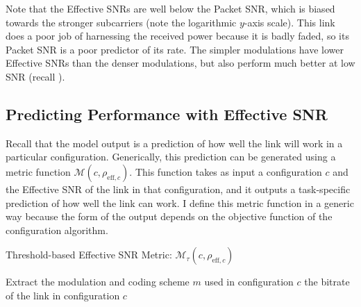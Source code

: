 Note that the Effective SNRs are well below the Packet SNR, which is biased towards the stronger subcarriers (note the logarithmic $y$-axis scale). This link does a poor job of harnessing the received power because it is badly faded, so its Packet SNR is a poor predictor of its rate. The simpler modulations have lower Effective SNRs than the denser modulations, but also perform much better at low SNR (recall ).


\subsection{Predicting Performance with Effective SNR}
Recall that the model output is a prediction of how well the link will work in a particular configuration. Generically, this prediction can be generated using a metric function $\mathcal{M}(c, \rho_{\text{eff},c})$. This function takes as input a configuration $c$ and the Effective SNR of the link in that configuration, and it outputs a task-specific prediction of how well the link can work. I define this metric function in a generic way because the form of the output depends on the objective function of the configuration algorithm.

\begin{algorithm}[tp]
\caption{\label{alg:threshold_metric}Threshold-based Effective SNR Metric: $\mathcal{M}_\tau(c,\rho_{\text{eff},c})$}
\begin{algorithmic}[1]
\STATE Extract the modulation and coding scheme $m$ used in configuration $c$
\RETURN the bitrate of the link in configuration $c$   
\ELSE
{} 
\ENDIF
\end{algorithmic}
\end{algorithm}

